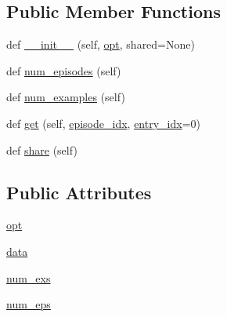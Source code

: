 \subsection*{Public Member Functions}
\begin{DoxyCompactItemize}
\item 
def \hyperlink{classparlai_1_1tasks_1_1dailydialog_1_1agents_1_1Convai2Teacher_a8dede379600bb9f0e942059ea2b0d9f0}{\+\_\+\+\_\+init\+\_\+\+\_\+} (self, \hyperlink{classparlai_1_1tasks_1_1dailydialog_1_1agents_1_1Convai2Teacher_a371a92d402235c804fcfc06d57272e1d}{opt}, shared=None)
\item 
def \hyperlink{classparlai_1_1tasks_1_1dailydialog_1_1agents_1_1Convai2Teacher_a2e260f4477f6fd9ec11a1a1663e32bef}{num\+\_\+episodes} (self)
\item 
def \hyperlink{classparlai_1_1tasks_1_1dailydialog_1_1agents_1_1Convai2Teacher_a6060e79bfc569e66d1c36af19522ed79}{num\+\_\+examples} (self)
\item 
def \hyperlink{classparlai_1_1tasks_1_1dailydialog_1_1agents_1_1Convai2Teacher_a1d6018e0044b71bc4ceb789e302d66a4}{get} (self, \hyperlink{classparlai_1_1core_1_1teachers_1_1FixedDialogTeacher_afd4ebab8063eb42d182d30a1a41f133e}{episode\+\_\+idx}, \hyperlink{classparlai_1_1core_1_1teachers_1_1FixedDialogTeacher_ae3201b15f3c3b46a2f3511bad9b43e7d}{entry\+\_\+idx}=0)
\item 
def \hyperlink{classparlai_1_1tasks_1_1dailydialog_1_1agents_1_1Convai2Teacher_ae9ac20bbc572a14bcd71f33fb8887599}{share} (self)
\end{DoxyCompactItemize}
\subsection*{Public Attributes}
\begin{DoxyCompactItemize}
\item 
\hyperlink{classparlai_1_1tasks_1_1dailydialog_1_1agents_1_1Convai2Teacher_a371a92d402235c804fcfc06d57272e1d}{opt}
\item 
\hyperlink{classparlai_1_1tasks_1_1dailydialog_1_1agents_1_1Convai2Teacher_ac7cf75fc10464ec7a06d118b8e8fe216}{data}
\item 
\hyperlink{classparlai_1_1tasks_1_1dailydialog_1_1agents_1_1Convai2Teacher_a067edc53b57e9157e32e740952ad4d79}{num\+\_\+exs}
\item 
\hyperlink{classparlai_1_1tasks_1_1dailydialog_1_1agents_1_1Convai2Teacher_a67499af89d747fa0efeae42d133e52c1}{num\+\_\+eps}
\end{DoxyCompactItemize}


